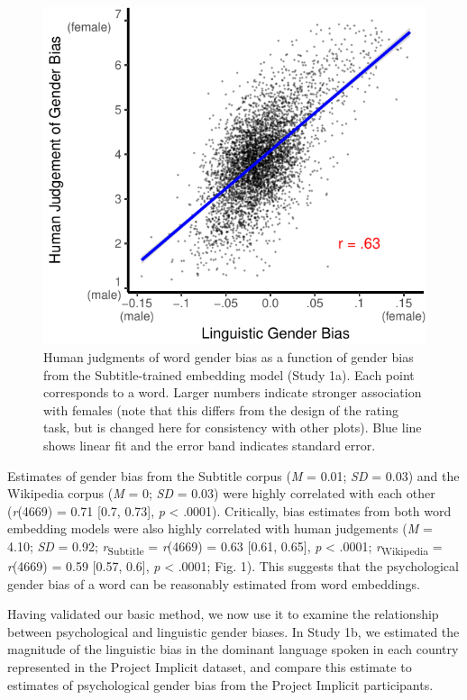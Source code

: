 \documentclass[9pt,twocolumn,twoside,lineno]{pnas-new}
\begin{document}
\begin{figure}
\centering
\includegraphics[width=.8\linewidth]{pnas_rmd/iat_lang_pnas_files/figure-latex/unnamed-chunk-10-1.pdf}
\caption{\label{fig:unnamed-chunk-10}Human judgments of word gender bias as
a function of gender bias from the Subtitle-trained embedding model
(Study 1a). Each point corresponds to a word. Larger numbers indicate
stronger association with females (note that this differs from the
design of the rating task, but is changed here for consistency with
other plots). Blue line shows linear fit and the error band indicates
standard error.}
\end{figure}

Estimates of gender bias from the Subtitle corpus (\emph{M} = 0.01;
\emph{SD} = 0.03) and the Wikipedia corpus (\emph{M} = 0; \emph{SD} =
0.03) were highly correlated with each other (\emph{r}(4669) = 0.71 {[}0.7, 0.73{]}, \emph{p} \textless{} .0001). Critically, bias estimates from both word embedding
models were also highly correlated with human judgements (\emph{M} = 4.10; \emph{SD} = 0.92; \emph{r}\textsubscript{Subtitle} = \emph{r}(4669) = 0.63 {[}0.61, 0.65{]}, \emph{p} \textless{} .0001; \emph{r}\textsubscript{Wikipedia} = \emph{r}(4669) = 0.59 {[}0.57, 0.6{]}, \emph{p} \textless{} .0001; Fig. 1). This suggests that the psychological gender bias of a word can be reasonably estimated from word embeddings.

Having validated our basic method, we now use it to examine the relationship
between psychological and linguistic gender biases. In Study 1b, we
estimated the magnitude of the linguistic bias in the dominant language
spoken in each country represented in the Project Implicit dataset, and
compare this estimate to estimates of psychological gender bias from the
Project Implicit participants.
\end{document}
